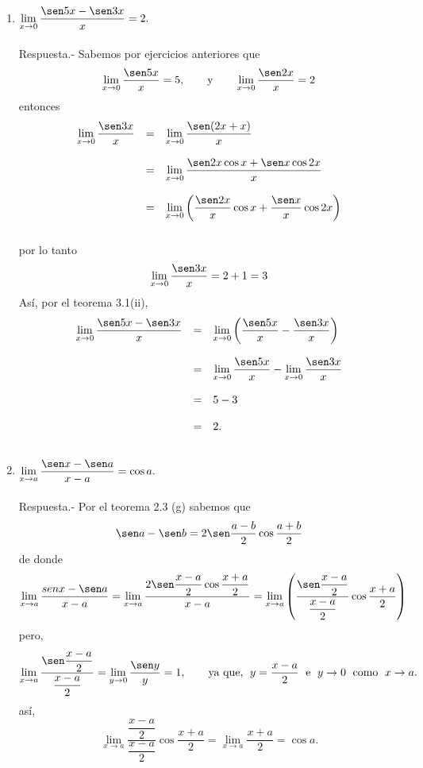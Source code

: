 \begin{enumerate}[\bfseries 1.]
    \item $\lim\limits_{x\to 0}\dfrac{\sen 5x - \sen 3x}{x}=2.$\\\\
	Respuesta.-\; Sabemos por ejercicios anteriores que
	$$\lim_{x\to 0}\dfrac{\sen 5x}{x}=5,\qquad \mbox{y} \qquad \lim_{x\to 0}\dfrac{\sen 2x}{x}=2$$
	entonces 
	$$\begin{array}{rcl}
	    \lim\limits_{x\to 0}\dfrac{\sen 3x}{x}&=&\lim\limits_{x\to 0} \dfrac{\sen (2x+x)}{x}\\\\
						  &=&\lim\limits_{x\to 0}\dfrac{\sen 2x \cos x + \sen x \cos 2x}{x}\\\\
						  &=&\lim\limits_{x\to 0}\left(\dfrac{\sen 2x}{x}\cos x + \dfrac{\sen x}{x}\cos 2x\right)\\\\
	\end{array}$$
	por lo tanto
	$$\lim_{x\to 0}\dfrac{\sen 3x}{x}=2+1=3$$
	Así, por el teorema 3.1(ii),
	$$\begin{array}{rcl}
	    \lim\limits_{x\to 0}\dfrac{\sen 5x-\sen 3x}{x}&=&\lim\limits_{x\to 0}\left(\dfrac{\sen 5x}{x}-\dfrac{\sen 3x}{x}\right)\\\\
	    &=&\lim\limits_{x\to 0}\dfrac{\sen 5x}{x}-\lim\limits_{x\to 0}\dfrac{\sen 3x}{x}\\\\
	    &=&5-3\\\\
	    &=&2.\\\\
	\end{array}$$

    \item $\lim\limits_{x\to a}\dfrac{\sen x - \sen a}{x-a}=\cos a.$\\\\
	Respuesta.-\; Por el teorema 2.3 (g) sabemos que 
	$$\sen a - \sen b = 2\sen \dfrac{a-b}{2} \cos \dfrac{a+b}{2}$$
	de donde 
	$$\lim_{x\to a}\dfrac{sen x-\sen a}{x-a}=\lim_{x\to a}\dfrac{2\sen \dfrac{x-a}{2}\cos \dfrac{x+a}{2}}{x-a} = \lim_{x\to a}\left(\dfrac{\sen \dfrac{x-a}{2}}{\dfrac{x-a}{2}}\cos \dfrac{x+a}{2}\right)$$
	pero,
	$$\lim_{x\to a}\dfrac{\sen \dfrac{x-a}{2}}{\dfrac{x-a}{2}}=\lim_{y\to 0}\dfrac{\sen y}{y}=1,\qquad \mbox{ya que, } \;y=\dfrac{x-a}{2} \; \mbox{ e } \; y\to 0 \;\mbox{ como }\; x\to a.$$
	así,
	$$\lim_{x\to a}\dfrac{\dfrac{x-a}{2}}{\dfrac{x-a}{2}}\cos \dfrac{x+a}{2}=\lim_{x\to a}\dfrac{x+a}{2}=\cos a.$$



\end{enumerate}
